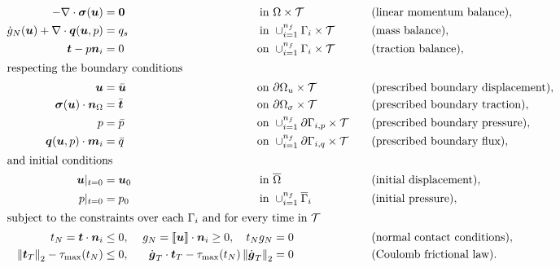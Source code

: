 \documentclass[3p,times]{elsarticle}
\theoremstyle{plain}
\renewcommand{\vec}[1]{\boldsymbol{#1}}
\newcommand{\tensorOne}[1]{\boldsymbol#1}
\newcommand{\tensorTwo}[1]{\boldsymbol#1}
\begin{document}
\begin{subequations}
\begin{align}
  - \nabla \cdot \tensorTwo{\sigma} (\vec{u}) &= \vec{0} & \mbox{ in }& \Omega \times \mathcal{T}
    &&& &\mbox{(linear momentum balance)}, \label{eq:momentumBalanceS}\\
  \dot{g}_N(\vec{u}) + \nabla \cdot \vec{q} (\tensorOne{u},p) &= q_s & \mbox{ in }&
    \cup_{i=1}^{n_f}\Gamma_i \times \mathcal{T} &&& &\mbox{(mass balance)}, \label{eq:massBalanceS}\\
  \vec{t} - p \vec{n}_i &= 0 & \mbox{ on }& \cup_{i=1}^{n_f}\Gamma_i \times \mathcal{T}
    &&& &\mbox{(traction balance)}, \label{eq:momentumBalanceS_F}\\
  \intertext{respecting the boundary conditions}
  \vec{u} &= \bar{\vec{u}} & \mbox{ on }& \partial \Omega_{u} \times \mathcal{T} &&& &\mbox{(prescribed
    boundary displacement)}, \label{eq:momentumBalanceS_DIR}\\
  \tensorTwo{\sigma}(\tensorOne{u}) \cdot \vec{n}_\Omega &= \bar{\vec{t}} & \mbox{ on }&
    \partial \Omega_{\sigma} \times \mathcal{T} &&& &\mbox{(prescribed boundary traction)},
    \label{eq:momentumBalanceS_NEU}\\
  p &= \bar{p} & \mbox{ on }& \cup_{i=1}^{n_f}\partial \Gamma_{i,p} \times \mathcal{T} &&& &\mbox{(prescribed boundary
    pressure)}, \label{eq:massBalanceS_DIR}\\
  \vec{q}(\tensorOne{u},p) \cdot \vec{m}_i &= \bar{q} & \mbox{ on }& \cup_{i=1}^{n_f}\partial \Gamma_{i,q} \times \mathcal{T} &&&
    &\mbox{(prescribed boundary flux)}, \label{eq:massBalanceS_NEU}\\
  \intertext{and initial conditions}
  \vec{u}|_{t=0} &= \vec{u}_0 & \mbox{ in }& \overline{\Omega} &&& &\mbox{(initial
    displacement)}, \label{eq:ICu}\\
  p|_{t=0} &= p_0 & \mbox{ in }& \cup_{i=1}^{n_f}\overline{\Gamma}_i &&& &\mbox{(initial pressure)},
   \label{eq:ICp}\\
  \intertext{subject to the constraints over each $\Gamma_i$ and for every time in $\mathcal{T}$}
  t_N = \vec{t} \cdot \vec{n}_i &\le 0, & g_N = \llbracket \vec{u} \rrbracket \cdot
    \vec{n}_i \ge 0, \quad t_N g_N &= 0 &&& &\mbox{(normal contact conditions)},
    \label{eq:normal_contact_KKT} \\
  \left\| \vec{t}_T \right\|_2 - \tau_{\max}(t_N) & \le 0, & \dot{\vec{g}}_T \cdot
    \vec{t}_T - \tau_{\max}(t_N) \left\| \dot{\vec{g}}_T \right\|_2 &= 0 &&& &
    \mbox{(Coulomb frictional law)}. \label{eq:frictional_contact_KKT}
\end{align}
\label{eq:IBVP}\null
\end{subequations}
\end{document}
